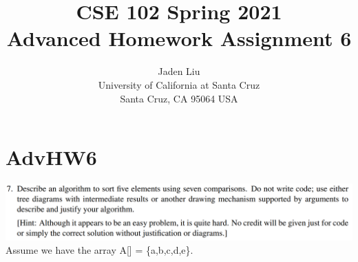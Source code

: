\documentclass[12pt]{article}
\begin{document}
\title{ CSE 102 Spring 2021\\
	Advanced Homework Assignment 6}

\author{Jaden Liu \\ 
University of California at Santa Cruz\\
Santa Cruz, CA 95064 USA }

\maketitle


\section{AdvHW6} 
\includegraphics[scale=0.25]{adv_7.png}
Assume we have the array A[] = \{a,b,c,d,e\}.
\end{document}
